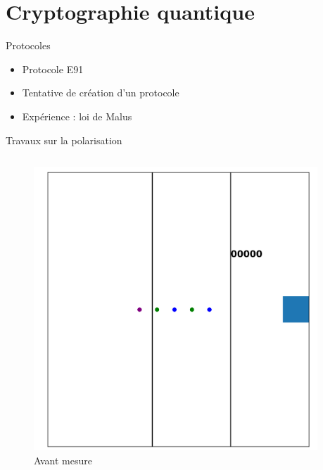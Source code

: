 \documentclass[french]{beamer}
\begin{document}
\section{Cryptographie quantique}

\begin{frame}{Protocoles}
    \begin{itemize}
        \item<1-> Protocole E91
        \item<2-> Tentative de création d'un protocole
        \item<3-> Expérience : loi de Malus
    \end{itemize}
\end{frame}

\begin{frame}{Travaux sur la polarisation}
    \begin{columns}
        \begin{column}{0.5\textwidth}
            \begin{figure}
                \captionsetup{labelformat=empty}
                \includegraphics[scale=0.1]{AvantMesure.png}
                \caption{\small Avant mesure}
            \end{figure}
        \end{column}
        \begin{column}{0.5\textwidth}

\end{column}
\end{columns}
\end{frame}
\end{document}
